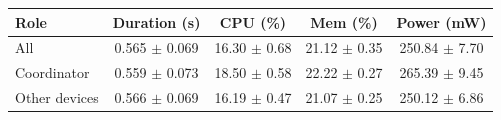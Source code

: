 \begin{tabular}{lcccc}
\hline
\textbf{Role} & \textbf{Duration (s)} & \textbf{CPU (\%)} & \textbf{Mem (\%)} & \textbf{Power (mW)} \\
\hline
All & 0.565 $\pm$ 0.069 & 16.30 $\pm$ 0.68 & 21.12 $\pm$ 0.35 & 250.84 $\pm$ 7.70 \\
Coordinator & 0.559 $\pm$ 0.073 & 18.50 $\pm$ 0.58 & 22.22 $\pm$ 0.27 & 265.39 $\pm$ 9.45 \\
Other devices & 0.566 $\pm$ 0.069 & 16.19 $\pm$ 0.47 & 21.07 $\pm$ 0.25 & 250.12 $\pm$ 6.86 \\
\hline
\end{tabular}
